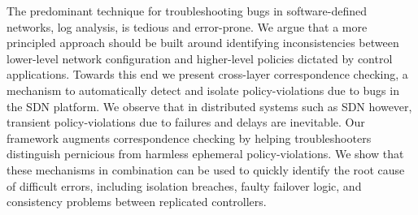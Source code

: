 The predominant technique for troubleshooting bugs in software-defined networks,
log analysis, is tedious and error-prone. We argue that a more principled
approach should be built around identifying inconsistencies between lower-level
network configuration and higher-level policies dictated by control
applications. Towards this end we present
cross-layer correspondence checking, a mechanism to automatically detect and
isolate policy-violations due to bugs in the SDN platform. We observe that in
distributed systems such as SDN however,
transient policy-violations due to failures and delays are inevitable.
Our \simulator{} framework augments correspondence checking by helping troubleshooters
distinguish pernicious from harmless ephemeral policy-violations.
We show that these mechanisms in combination can be used to quickly
identify the root cause of difficult errors, including isolation breaches,
faulty failover logic, and consistency problems between replicated
controllers.

